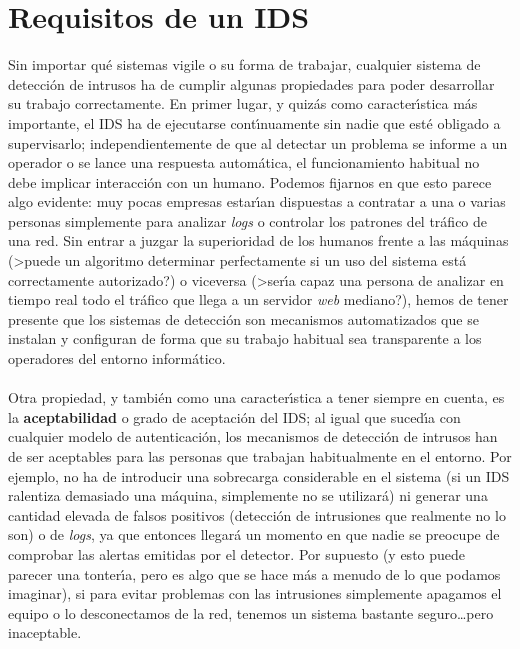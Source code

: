 \section{Requisitos de un IDS}
Sin importar qu\'e sistemas vigile o su forma de trabajar, cualquier
sistema de detecci\'on de intrusos ha de cumplir algunas propiedades para
poder desarrollar su trabajo correctamente. En primer lugar, y quiz\'as como
caracter\'{\i}stica m\'as importante, el IDS ha de ejecutarse 
cont\'{\i}nuamente sin nadie que est\'e obligado a supervisarlo; 
independientemente de que al detectar un problema se informe a un operador o se 
lance una respuesta autom\'atica, el funcionamiento habitual no debe implicar 
interacci\'on con un humano. Podemos fijarnos en que esto parece algo evidente:
muy pocas empresas estar\'{\i}an dispuestas a contratar a una o varias personas
simplemente para analizar {\it logs} o controlar los patrones del tr\'afico de  
una red. Sin entrar a juzgar la superioridad de los humanos frente a las 
m\'aquinas (>puede un algoritmo determinar perfectamente si un uso del sistema 
est\'a correctamente autorizado?) o viceversa (>ser\'{\i}a capaz una persona de 
analizar en tiempo real todo el tr\'afico que llega a un servidor {\it web} 
mediano?), hemos de tener presente que los sistemas de detecci\'on son 
mecanismos automatizados que se instalan y configuran de forma que su 
trabajo habitual sea transparente a los operadores del entorno inform\'atico.\\
\\Otra propiedad, y tambi\'en como una caracter\'{\i}stica a tener siempre en
cuenta, es la {\bf aceptabilidad} o grado de aceptaci\'on del IDS; al igual que
suced\'{\i}a con cualquier modelo de autenticaci\'on, los mecanismos de
detecci\'on de intrusos han de ser aceptables para las personas que trabajan 
ha\-bi\-tual\-men\-te en el entorno. Por ejemplo, no ha de introducir una 
sobrecarga 
considerable en el sistema (si un IDS ralentiza demasiado una m\'aquina, 
simplemente no se utilizar\'a) ni generar una cantidad elevada de falsos 
positivos (detecci\'on de intrusiones que realmente no lo son) o de 
{\it logs}, ya que entonces llegar\'a un momento en que nadie se preocupe de 
comprobar las alertas emitidas por el detector. Por supuesto (y esto puede 
parecer una tonter\'{\i}a, pero es algo que se hace m\'as a menudo de lo que 
podamos imaginar), si para evitar problemas con las intrusiones simplemente 
apagamos el equipo o lo desconectamos de la red, tenemos un sistema bastante 
seguro\ldots pero inaceptable.\\

